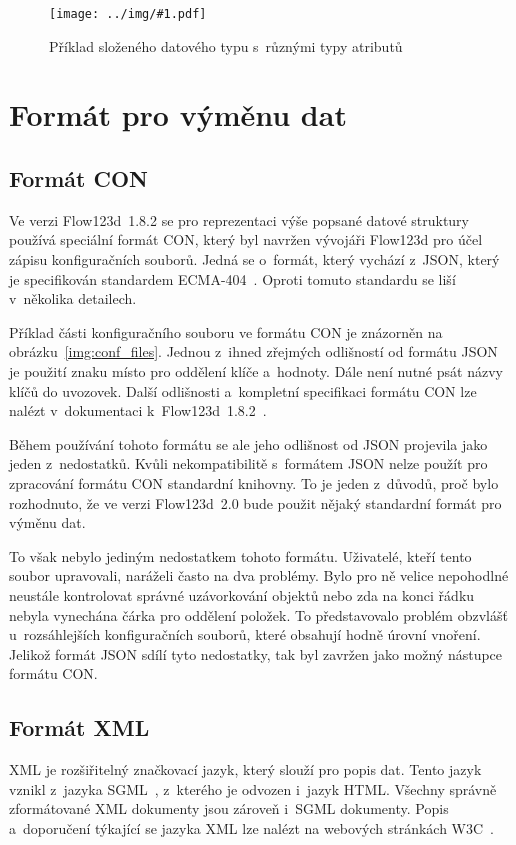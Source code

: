 \documentclass[FM,bw,DP]{tulthesis}
\newcommand{\includeimg}[2]{%
\begin{figure}[h]
	\centering
    \texttt{[image: ../img/\#1.pdf]}
    \caption{#2}
	\label{img:#1}
\end{figure}
}
\begin{document}
\includeimg{data_tree}{Příklad složeného datového typu s~různými typy atributů}

\section{Formát pro výměnu dat}

\subsection{Formát CON}

Ve verzi Flow123d~1.8.2 se pro reprezentaci výše popsané datové struktury používá speciální formát \gls{CON}, který byl navržen vývojáři Flow123d pro účel zápisu konfiguračních souborů. Jedná se o~formát, který vychází z~\gls{JSON}, který je specifikován standardem ECMA-404~\cite{bib:ecma404}. Oproti tomuto standardu se liší v~několika detailech.

Příklad části konfiguračního souboru ve formátu \gls{CON} je znázorněn na obrázku~\ref{img:conf_files}. Jednou z~ihned zřejmých odlišností od formátu \gls{JSON} je použití znaku \uv{\texttt{=}} místo \uv{\texttt{:}} pro oddělení klíče a~hodnoty. Dále není nutné psát názvy klíčů do uvozovek. Další odlišnosti a~kompletní specifikaci formátu \gls{CON} lze nalézt v~dokumentaci k~Flow123d~1.8.2~\cite{bib:flow123d-manual}.

Během používání tohoto formátu se ale jeho odlišnost od \gls{JSON} projevila jako jeden z~nedostatků. Kvůli nekompatibilitě s~formátem \gls{JSON} nelze použít pro zpracování formátu \gls{CON} standardní knihovny. To je jeden z~důvodů, proč bylo rozhodnuto, že ve verzi Flow123d~2.0 bude použit nějaký standardní formát pro výměnu dat.

To však nebylo jediným nedostatkem tohoto formátu. Uživatelé, kteří tento soubor upravovali, naráželi často na dva problémy. Bylo pro ně velice nepohodlné neustále kontrolovat správné uzávorkování objektů nebo zda na konci řádku nebyla vynechána čárka pro oddělení položek. To představovalo problém  obzvlášť u~rozsáhlejších konfiguračních souborů, které obsahují hodně úrovní vnoření. Jelikož formát \gls{JSON} sdílí tyto nedostatky, tak byl zavržen jako možný nástupce formátu \gls{CON}.

\subsection{Formát XML}

\gls{XML} je rozšiřitelný značkovací jazyk, který slouží pro popis dat. Tento jazyk vznikl z~jazyka \gls{SGML}~\cite{bib:sgml-iso}, z~kterého je odvozen i~jazyk \gls{HTML}. Všechny správně zformátované \gls{XML} dokumenty jsou zároveň i~\gls{SGML} dokumenty. Popis a~doporučení týkající se jazyka \gls{XML} lze nalézt na webových stránkách \gls{W3C}~\cite{bib:xml}.
\end{document}
